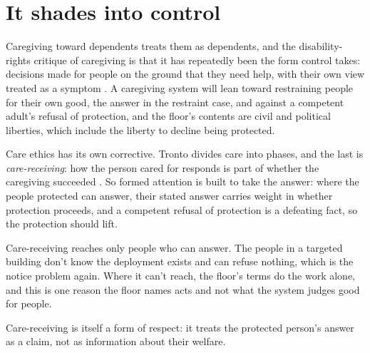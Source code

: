 \section{It shades into control}
\label{sec:20.10}
Caregiving toward dependents treats them as dependents, and the disability-rights critique of caregiving is that it has repeatedly been the form control takes: decisions made for people on the ground that they need help, with their own view treated as a symptom \autocite{shakespeare2000help}.
A caregiving system will lean toward restraining people for their own good, the answer in the restraint case, and against a competent adult's refusal of protection, and the floor's contents are civil and political liberties, which include the liberty to decline being protected.

Care ethics has its own corrective. Tronto divides care into phases, and the last is \emph{care-receiving}: how the person cared for responds is part of whether the caregiving succeeded \autocite{tronto1993moral}. So formed attention is built to take the answer: where the people protected can answer, their stated answer carries weight in whether protection proceeds, and a competent refusal of protection is a defeating fact, so the protection should lift.

Care-receiving reaches only people who can answer. The people in a targeted building don't know the deployment exists and can refuse nothing, which is the notice problem again. Where it can't reach, the floor's terms do the work alone, and this is one reason the floor names acts and not what the system judges good for people.

Care-receiving is itself a form of respect: it treats the protected person's answer as a claim, not as information about their welfare.

